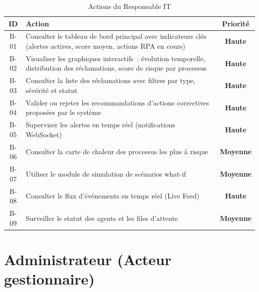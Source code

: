 \documentclass[12pt,a4paper]{report}
\newcommand{\high}{\textcolor{redAlert}{\textbf{Haute}}}
\newcommand{\medium}{\textcolor{attijariOrange}{\textbf{Moyenne}}}
\begin{document}
\begin{table}[H]
\centering
\caption{Actions du Responsable IT}
\begin{tabularx}{\textwidth}{|c|X|c|}
\hline
\textbf{ID} & \textbf{Action} & \textbf{Priorité} \\
\hline
B-01 & Consulter le tableau de bord principal avec indicateurs clés (alertes actives, score moyen, actions RPA en cours) & \high \\
\hline
B-02 & Visualiser les graphiques interactifs~: évolution temporelle, distribution des réclamations, score de risque par processus & \high \\
\hline
B-03 & Consulter la liste des réclamations avec filtres par type, sévérité et statut & \high \\
\hline
B-04 & Valider ou rejeter les recommandations d'actions correctives proposées par le système & \high \\
\hline
B-05 & Superviser les alertes en temps réel (notifications WebSocket) & \high \\
\hline
B-06 & Consulter la carte de chaleur des processus les plus à risque & \medium \\
\hline
B-07 & Utiliser le module de simulation de scénarios what-if & \medium \\
\hline
B-08 & Consulter le flux d'événements en temps réel (Live Feed) & \high \\
\hline
B-09 & Surveiller le statut des agents et les files d'attente & \medium \\
\hline
\end{tabularx}
\end{table}

\section{Administrateur (Acteur gestionnaire)}
\end{document}
